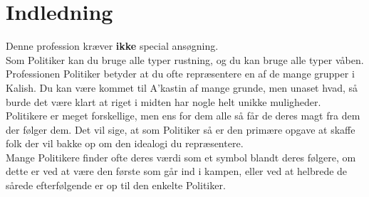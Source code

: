 
\chapter*{Indledning}

Denne profession kræver \textbf{ikke} special ansøgning.\\
Som Politiker kan du bruge alle typer rustning, og du kan bruge alle typer våben.\\

Professionen Politiker betyder at du ofte repræsentere en af de mange grupper i Kalish. Du kan være kommet til A'kastin af mange grunde, men unaset hvad, så burde det være klart at riget i midten har nogle helt unikke muligheder.\\
Politikere er meget forskellige, men ens for dem alle så får de deres magt fra dem der følger dem. Det vil sige, at som Politiker så er den primære opgave at skaffe folk der vil bakke op om den idealogi du repræsentere.\\
Mange Politikere finder ofte deres værdi som et symbol blandt deres følgere, om dette er ved at være den første som går ind i kampen, eller ved at helbrede de sårede efterfølgende er op til den enkelte Politiker.